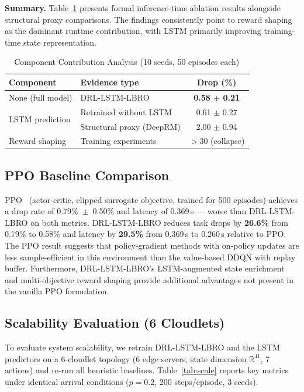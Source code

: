 \documentclass[conference]{IEEEtran}
\begin{document}
\textbf{Summary.}
Table~\ref{tab:ablation} presents formal inference-time ablation results
alongside structural proxy comparisons. The findings consistently point
to reward shaping as the dominant runtime contribution, with LSTM
primarily improving training-time state representation.

\begin{table}[htbp]
\centering
\caption{Component Contribution Analysis (10 seeds, 50 episodes each)}
\label{tab:ablation}
\begin{tabular}{llc}
\toprule
\textbf{Component} & \textbf{Evidence type} & \textbf{Drop (\%)} \\
\midrule
None (full model) & DRL-LSTM-LBRO               & \textbf{0.58 $\pm$ 0.21} \\
\midrule
\multirow{2}{*}{LSTM prediction}
  & Retrained without LSTM         & 0.61 $\pm$ 0.27 \\
  & Structural proxy (DeepRM)      & 2.00 $\pm$ 0.94 \\
\midrule
Reward shaping & Training experiments & $>$30 (collapse) \\
\bottomrule
\end{tabular}
\end{table}

\subsection{PPO Baseline Comparison}
\label{sec:ppo}

PPO~\cite{schulman2017ppo} (actor-critic, clipped surrogate objective,
trained for 500 episodes) achieves a drop rate of 0.79\%~$\pm$~0.50\%
and latency of 0.369\,s --- worse than DRL-LSTM-LBRO on both metrics.
DRL-LSTM-LBRO reduces task drops by \textbf{26.6\%} from 0.79\% to 0.58\%
and latency by \textbf{29.5\%} from 0.369\,s to 0.260\,s relative to PPO.
The PPO result suggests that policy-gradient methods with on-policy updates
are less sample-efficient in this environment than the value-based DDQN
with replay buffer. Furthermore, DRL-LSTM-LBRO's LSTM-augmented state
enrichment and multi-objective reward shaping provide additional
advantages not present in the vanilla PPO formulation.

\subsection{Scalability Evaluation (6 Cloudlets)}
\label{sec:scale}

To evaluate system scalability, we retrain DRL-LSTM-LBRO and the
LSTM predictors on a 6-cloudlet topology (6 edge servers, state
dimension $\mathbb{R}^{41}$, 7 actions) and re-run all heuristic
baselines. Table~\ref{tab:scale} reports key metrics under identical
arrival conditions ($p{=}0.2$, 200 steps/episode, 3 seeds).
\end{document}
